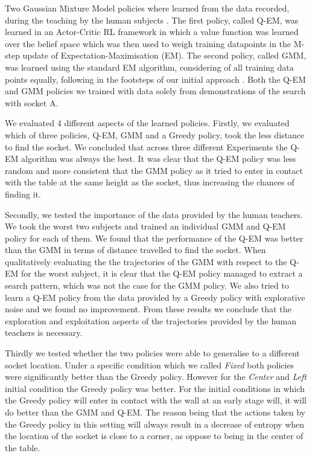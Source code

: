 Two Gaussian Mixture Model policies where learned from the data recorded, during the teaching by the human subjects . 
The first policy, called Q-EM, was learned in an Actor-Critic RL framework in which a value function was learned over 
the belief space which was then used to weigh training datapoints in the M-step update of Expectation-Maximisation (EM). The second 
policy, called GMM, was learned using the standard EM algorithm, considering of all training data points equally,
following in the footsteps of our initial approach \cite{Chambrier2014}. Both the Q-EM and GMM policies we trained 
with data solely from demonstrations of the search with socket A.

We evaluated 4 different aspects of the learned policies. Firstly, we evaluated which of three policies, Q-EM, GMM and a Greedy policy, 
took the less distance to find the socket. We concluded that across three different Experiments the Q-EM algorithm was always 
the best. It was clear that the Q-EM policy was less random and more consistent that the GMM policy as it tried to enter in 
contact with the table at the same height as the socket, thus increasing the chances of finding it.

Secondly, we tested the importance of the data provided by the human teachers. We took the worst two subjects and trained an
individual GMM and Q-EM policy for each of them. We found that the performance of the Q-EM was better than the GMM in terms 
of distance travelled to find the socket. When qualitatively evaluating the the trajectories of the GMM with respect to the 
Q-EM for the worst subject, it is clear that the Q-EM policy managed to extract a search pattern, which was not the case 
for the GMM policy. We also tried to learn a Q-EM policy from the data provided by a Greedy policy with explorative noise 
and we found no improvement. From these results we conclude that the exploration and exploitation aspects of the trajectories 
provided by the human teachers is necessary.

Thirdly we tested whether the two policies were able to generalise to a different socket location. Under a specific condition
which we called \textit{Fixed} both policies were significantly better than the Greedy policy. However for the \textit{Center}
and \textit{Left} initial condition the Greedy policy was better. For the initial conditions in which the Greedy policy will 
enter in contact with the wall at an early stage will, it will do better than the GMM and Q-EM.  The reason being that 
the actions taken by the Greedy policy in this setting will always result in a decrease of entropy when the location
of the socket is close to a corner, as oppose to being in the center of the table.

